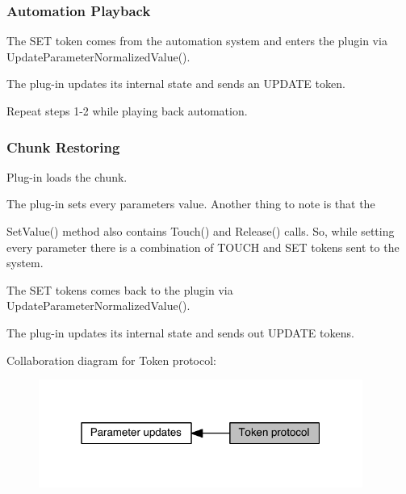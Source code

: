 \hypertarget{a00352_tokenProtocol_standardTokenOperation_automationPlayback}{}\subsubsection{Automation Playback}\label{a00352_tokenProtocol_standardTokenOperation_automationPlayback}

\begin{DoxyEnumerate}
\item The S\+E\+T token comes from the automation system and enters the plugin via Update\+Parameter\+Normalized\+Value().
\item The plug-\/in updates it\textquotesingle{}s internal state and sends an U\+P\+D\+A\+T\+E token.
\item Repeat steps 1-\/2 while playing back automation.
\end{DoxyEnumerate}

\hypertarget{a00352_tokenProtocol_standardTokenOperation_chunkRestoring}{}\subsubsection{Chunk Restoring}\label{a00352_tokenProtocol_standardTokenOperation_chunkRestoring}

\begin{DoxyEnumerate}
\item Plug-\/in loads the chunk.
\item The plug-\/in sets every parameters value. Another thing to note is that the
\item Set\+Value() method also contains Touch() and Release() calls. So, while setting every parameter there is a combination of T\+O\+U\+C\+H and S\+E\+T tokens sent to the system.
\item The S\+E\+T tokens comes back to the plugin via Update\+Parameter\+Normalized\+Value().
\item The plug-\/in updates it\textquotesingle{}s internal state and sends out U\+P\+D\+A\+T\+E tokens.
\end{DoxyEnumerate}

 Collaboration diagram for Token protocol\+:
\nopagebreak
\begin{figure}[H]
\begin{center}
\leavevmode
\includegraphics[width=301pt]{a00352}
\end{center}
\end{figure}
